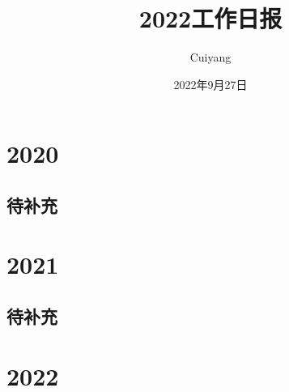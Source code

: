 \documentclass[12pt,a4paper]{ctexart}
\title{\heiti 2022工作日报}
\author{Cuiyang}
\date{\kaishu 2022年9月27日}
\begin{document}
	\maketitle
	\tableofcontents
	\clearpage
	\section{2020}
		\subsection{待补充}
	\section{2021}
		\subsection{待补充}
	\section{2022}
\end{document}
